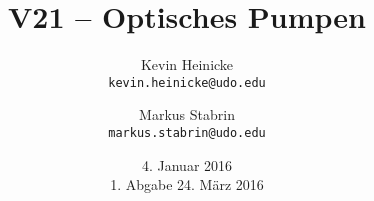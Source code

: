 


\title{%
    V21 -- Optisches Pumpen
}
\author{%
    Kevin Heinicke\\
    \texttt{kevin.heinicke@udo.edu}
    \and
    Markus Stabrin\\
    \texttt{markus.stabrin@udo.edu}
}
\date{%
    4. Januar 2016\\
    {\small 1. Abgabe} 24. März 2016\\
}

    \maketitle%
    \tableofcontents
    \newpage
    
    

    \printbibliography

